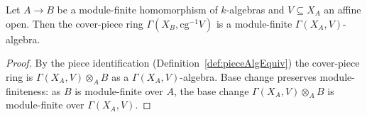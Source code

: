 \begin{lemma}
  \label{lem:finite_pieceCover}
  \leanok
  Let \(A \to B\) be a module-finite homomorphism of \(k\)-algebras and \(V \subseteq X_A\) an affine
  open. Then the cover-piece ring \(\Gamma(X_B, \mathrm{cg}^{-1}V)\) is a module-finite \(\Gamma(X_A,
  V)\)-algebra.
\end{lemma}
\begin{proof}
  \leanok
  By the piece identification (Definition~\ref{def:pieceAlgEquiv}) the cover-piece ring is \(\Gamma(
  X_A, V) \otimes_A B\) as a \(\Gamma(X_A, V)\)-algebra. Base change preserves module-finiteness: as
  \(B\) is module-finite over \(A\), the base change \(\Gamma(X_A, V) \otimes_A B\) is module-finite
  over \(\Gamma(X_A, V)\).
\end{proof}

